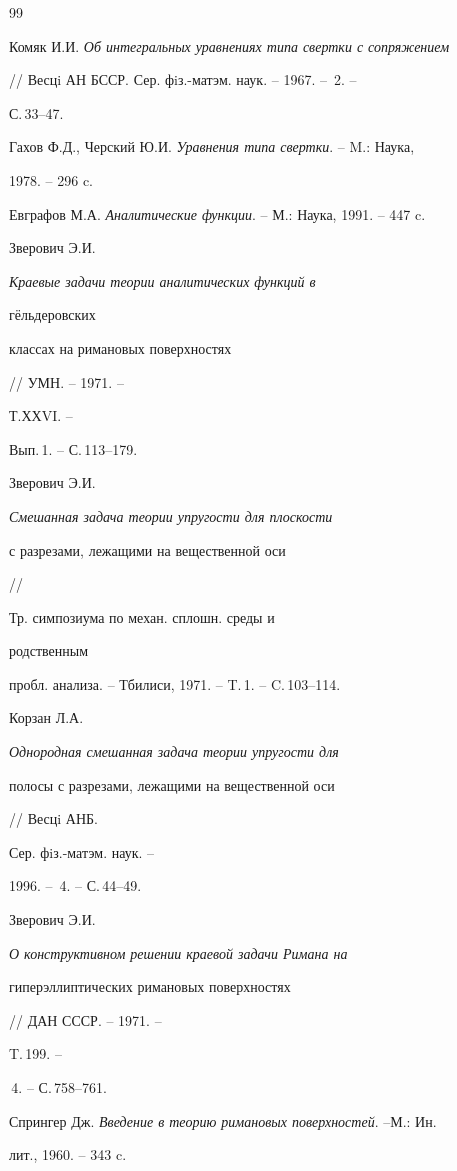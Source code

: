 \begin{thebibliography}{99} 


 




Комяк И.И. {\em Об интегральных уравнениях типа свертки с сопряжением} 


// Весцi АН БССР. Сер. фiз.-матэм. наук. -- 1967. -- \No\,2. --  


С.\,33--47. 




Гахов Ф.Д., Черский Ю.И. {\em Уравнения типа свертки}. -- M.: Наука, 


1978. -- 296 c. 




Евграфов М.А. {\em Аналитические функции}. -- М.: Наука, 1991. -- 447 c. 




Зверович Э.И. {\em Краевые задачи теории аналитических функций в 


г\"ельдеровских 


классах на римановых поверхностях} // УМН. -- 1971. -- 


Т.ХХVI. --  


Вып.\,1. -- С.\,113--179. 




Зверович Э.И. {\em Смешанная задача теории упругости для плоскости


с разрезами, лежащими на вещественной оси} //


Тр. симпозиума по механ. сплошн. среды и 


родственным 


пробл. анализа. -- Тбилиси, 1971. -- T.\,1. -- C.\,103--114. 




Корзан Л.А. {\em Однородная смешанная задача теории упругости для 


полосы с разрезами, лежащими на вещественной оси} // Весцi АНБ. 


Сер. фiз.-матэм. наук. -- 


1996. -- \No\,4. -- С.\,44--49. 




Зверович Э.И. {\em О конструктивном решении краевой задачи Римана на 


гиперэллиптических римановых поверхностях} // ДАН СССР. -- 1971. -- 


T.\,199. --  


\No\,4. -- С.\,758--761. 




Спрингер Дж. {\em Введение в теорию римановых поверхностей}. --М.: Ин. 


лит., 1960. -- 343 c. 


 


\end{thebibliography} 


 


\vskip 2cm 


 






 


\label{end} 


 


